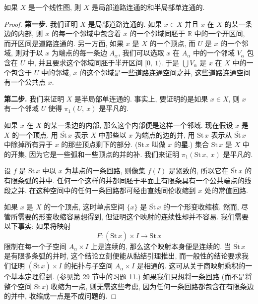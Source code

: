 \begin{lemma}[线性图局部道路连通且半局部单连通]
\label{lemma:ch14-graph-locally}
如果 $X$ 是一个线性图, 则 $X$ 是局部道路连通的和半局部单连通的.
\end{lemma}

\begin{proof}
\textbf{第一步.} 我们证明 $X$ 是局部道路连通的. 如果 $x\in X$ 并且 $x$ 在 $X$ 的某一条边的内部, 则 $x$ 的每一个邻域中包含着 $x$ 的一个邻域同胚于 $\mathbb{R}$ 中的一个开区间, 而开区间是道路连通的. 另一方面, 如果 $x$ 是 $X$ 的一个顶点, 而 $U$ 是 $x$ 的一个邻域, 则对于以 $x$ 为端点的每一条边 $A_{\alpha}$, 我们可以选取 $x$ 在 $A_{\alpha}$ 中的一个邻域 $V_{\alpha}$ 包含在 $U$ 中, 并且要求这个邻域同胚于半开区间 $[0,\ 1)$. 于是 $\bigcup V_{\alpha}$ 是 $x$ 在 $X$ 中的一个包含于 $U$ 中的邻域, $x$ 的这个邻域是一些道路连通空间之并, 这些道路连通空间有一个公共点 $x$.

\textbf{第二步.} 我们来证明 $X$ 是半局部单连通的. 事实上, 要证明的是如果 $x\in X$, 则 $x$ 有一个邻域 $U$ 使得 $\pi_{1}(U,\ x)$ 是平凡的.

如果 $x$ 在 $X$ 的某一条边的内部, 那么这个内部便是这样一个邻域. 现在假设 $x$ 是 $X$ 的一个顶点. 用 $\overline{\mathrm{St}}\,x$ 表示 $X$ 中那些以 $x$ 为端点的边的并, 用 $\mathrm{St}\,x$ 表示从 $\overline{\mathrm{St}}\,x$ 中除掉所有异于 $x$ 的那些顶点剩下的部分. ($\mathrm{St}\,x$ 叫做 $x$ 的\textbf{星}.) 集合 $\mathrm{St}\,x$ 是 $X$ 中的开集, 因为它是一些弧和一些顶点的并的补. 我们来证明 $\pi_{1}(\mathrm{St}\,x,\ x)$ 是平凡的.

设 $f$ 是 $\mathrm{St}\,x$ 中以 $x$ 为基点的一条回路, 则像集 $f(I)$ 是紧致的, 所以它在 $\overline{\mathrm{St}}\,x$ 的有限条弧的并中. 任何一个这样的并都同胚于平面上有限条具有一个公共端点的线段之并. 在这种空间中的任何一条回路都可经由直线同伦收缩到 $x$ 处的常值回路.

如果 $x$ 是 $X$ 的一个顶点, 这时单点空间 $\{x\}$ 是 $\overline{\mathrm{St}}\,x$ 的一个形变收缩核. 然而, 尽管所需要的形变收缩容易想得到, 但证明这个映射的连续性却并不容易. 我们需要以下事实: 如果将映射
\[
F\colon(\overline{\mathrm{St}}\,x)\times I\longrightarrow\overline{\mathrm{St}}\,x
\]
限制在每一个子空间 $A_{\alpha}\times I$ 上是连续的, 那么这个映射本身便是连续的. 当 $\overline{\mathrm{St}}\,x$ 是有限多条弧的并时, 这个结论立刻便能从黏结引理推出, 而一般性的结论要求我们证明 $(\overline{\mathrm{St}}\,x)\times I$ 的拓扑与子空间 $A_{\alpha}\times I$ 是相通的. 这可从关于商映射乘积的一个基本定理得到. (参见第 29 节中的习题 11.) 如果我们只想将一条回路 (而不是将整个空间 $\overline{\mathrm{St}}\,x$) 收缩为一点, 则无需这些考虑, 因为任何一条回路都包含在有限条边的并中, 收缩成一点是不成问题的.
\end{proof}

